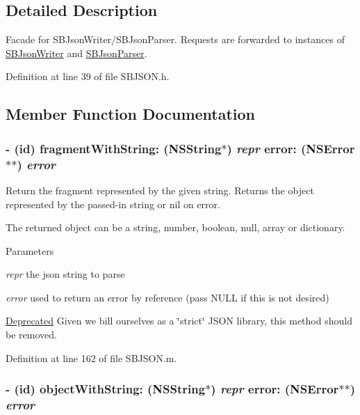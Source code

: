\subsection{Detailed Description}
Facade for SBJsonWriter/SBJsonParser. Requests are forwarded to instances of \hyperlink{interface_s_b_json_writer}{SBJsonWriter} and \hyperlink{interface_s_b_json_parser}{SBJsonParser}. 

Definition at line 39 of file SBJSON.h.

\subsection{Member Function Documentation}
\hypertarget{interface_s_b_j_s_o_n_aa88f7cb9ddc4ab7fd6e9fc0853e6da6a}{
\subsubsection[{fragmentWithString:error:}]{\setlength{\rightskip}{0pt plus 5cm}-\/ (id) fragmentWithString: ({\bf NSString}$\ast$) {\em repr}\/ error: (NSError$\ast$$\ast$) {\em error}}}
\label{interface_s_b_j_s_o_n_aa88f7cb9ddc4ab7fd6e9fc0853e6da6a}


Return the fragment represented by the given string. Returns the object represented by the passed-\/in string or nil on error.

The returned object can be a string, number, boolean, null, array or dictionary.


\begin{DoxyParams}{Parameters}
\item[{\em repr}]the json string to parse \item[{\em error}]used to return an error by reference (pass NULL if this is not desired)\end{DoxyParams}
\begin{Desc}
\item[\hyperlink{deprecated__deprecated000006}{Deprecated}]Given we bill ourselves as a \char`\"{}strict\char`\"{} JSON library, this method should be removed. \end{Desc}


Definition at line 162 of file SBJSON.m.\hypertarget{interface_s_b_j_s_o_n_a2b0ae389a765270663c1e1110bcef613}{
\subsubsection[{objectWithString:error:}]{\setlength{\rightskip}{0pt plus 5cm}-\/ (id) objectWithString: ({\bf NSString}$\ast$) {\em repr}\/ error: (NSError$\ast$$\ast$) {\em error}}}
\label{interface_s_b_j_s_o_n_a2b0ae389a765270663c1e1110bcef613}


